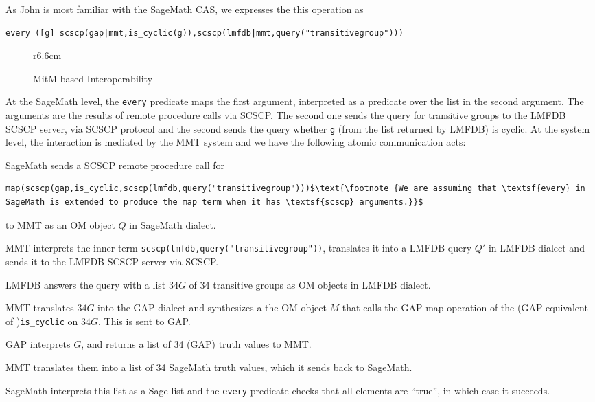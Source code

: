 As John is most familiar with the SageMath CAS, we expresses the this operation as 
\begin{lstlisting}
every ([g] scscp(gap|mmt,is_cyclic(g)),scscp(lmfdb|mmt,query("transitivegroup"))) 
\end{lstlisting}

\begin{wrapfigure}r{6.6cm}\vspace*{-2em}
  \vspace*{-1em}
  \caption{MitM-based Interoperability}\label{fig:mitmcomm}\vspace*{-1em}
\end{wrapfigure}
At the SageMath level, the \lstinline|every| predicate maps the first argument, interpreted as a predicate over the list in the second argument. 
The arguments are the results of remote procedure calls via SCSCP. 
The second one sends the query for transitive groups to the LMFDB SCSCP server, via SCSCP protocol and the second sends the query whether \lstinline|g| (from the list returned by LMFDB) is cyclic.
At the system level, the interaction is mediated by the MMT system and we have the following atomic communication acts: 
\begin{compactenum}
\item SageMath sends a SCSCP remote procedure call for 
  \begin{lstlisting}[mathescape]
    map(scscp(gap,is_cyclic,scscp(lmfdb,query("transitivegroup")))$\text{\footnote {We are assuming that \textsf{every} in SageMath is extended to produce the map term when it has \textsf{scscp} arguments.}}$
\end{lstlisting}
  to MMT as an OM object $Q$ in SageMath dialect.  
\item MMT interprets the inner term \lstinline|scscp(lmfdb,query("transitivegroup"))|, translates it into a LMFDB query $Q'$ in LMFDB dialect and sends it to the LMFDB SCSCP server via SCSCP. 
\item LMFDB answers the query with a list $34G$ of 34 transitive groups as OM objects in LMFDB dialect.
\item MMT translates $34G$ into the GAP dialect and synthesizes a the OM object $M$ that calls the GAP map operation of the (GAP equivalent of )\lstinline|is_cyclic| on $34G$. This is sent to GAP. 
\item GAP interprets $G$, and returns a list of 34 (GAP) truth values to MMT. 
\item MMT translates them into a list of 34 SageMath truth values, which it sends back to SageMath. 
\item SageMath interprets this list as a Sage list and the \lstinline|every| predicate checks that all elements are ``true'', in which case it succeeds. 
\end{compactenum}


